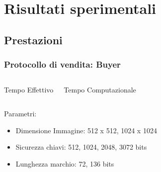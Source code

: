 \section{Risultati sperimentali}
\subsection{Prestazioni}
\begin{frame}
\frametitle{Protocollo di vendita: Buyer}
\begin{columns}[c]
   \begin{center}\end{center}
   \begin{center}\end{center}
 \end{columns}
 \begin{columns}[c]
   \begin{center}Tempo Effettivo\end{center}
   \begin{center}Tempo Computazionale\end{center}
 \end{columns}  
\begin{block}{Parametri:}
\begin{itemize}
\item Dimensione Immagine: 512 x 512, 1024 x 1024
\item Sicurezza chiavi: 512, 1024, 2048, 3072 bits
\item Lunghezza marchio: 72, 136 bits
\end{itemize}
\end{block}
\end{frame}


